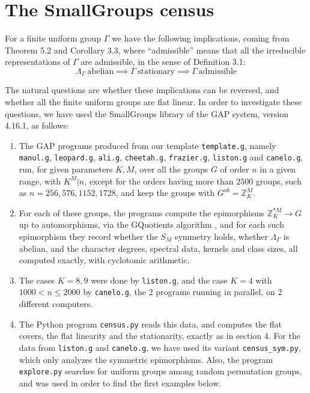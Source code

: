 \documentclass[12pt]{amsart}
\theoremstyle{definition}
\begin{document}
\section{The SmallGroups census}

For a finite uniform group $\Gamma$ we have the following implications, coming from Theorem 5.2 and Corollary 3.3, where ``admissible'' means that all the irreducible representations of $\Gamma$ are admissible, in the sense of Definition 3.1:
$$\Lambda_\Gamma\ \text{abelian}\implies\Gamma\ \text{stationary}\implies\Gamma\ \text{admissible}$$

The natural questions are whether these implications can be reversed, and whether all the finite uniform groups are flat linear. In order to investigate these questions, we have used the SmallGroups library \cite{bes} of the GAP system, version 4.16.1, as follows:

\begin{enumerate}
\item The GAP programs produced from our template {\tt template.g}, namely {\tt manul.g}, {\tt leopard.g}, {\tt ali.g}, {\tt cheetah.g}, {\tt frazier.g}, {\tt liston.g} and {\tt canelo.g}, run, for given parameters $K,M$, over all the groups $G$ of order $n$ in a given range, with $K^M|n$, except for the orders having more than $2500$ groups, such as $n=256,576,1152,1728$, and keep the groups with $G^{ab}=\mathbb Z_K^M$.

\smallskip

\item For each of these groups, the programs compute the epimorphisms $\mathbb Z_K^{*M}\to G$ up to automorphisms, via the GQuotients algorithm \cite{heo}, and for each such epimorphism they record whether the $S_M$ symmetry holds, whether $\Lambda_\Gamma$ is abelian, and the character degrees, spectral data, kernels and class sizes, all computed exactly, with cyclotomic arithmetic.

\smallskip

\item The cases $K=8,9$ were done by {\tt liston.g}, and the case $K=4$ with $1000<n\leq2000$ by {\tt canelo.g}, the 2 programs running in parallel, on 2 different computers.

\smallskip

\item The Python program {\tt census.py} reads this data, and computes the flat covers, the flat linearity and the stationarity, exactly as in section 4. For the data from {\tt liston.g} and {\tt canelo.g}, we have used its variant {\tt census\_sym.py}, which only analyzes the symmetric epimorphisms. Also, the program {\tt explore.py} searches for uniform groups among random permutation groups, and was used in order to find the first examples below.
\end{enumerate}
\end{document}
